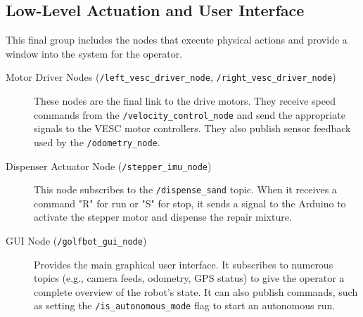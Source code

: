 \subsection{Low-Level Actuation and User Interface}
This final group includes the nodes that execute physical actions and provide a window into the system for the operator.
\begin{description}
    \item[Motor Driver Nodes (\texttt{/left\_vesc\_driver\_node}, \texttt{/right\_vesc\_driver\_node})] These nodes are the final link to the drive motors. They receive speed commands from the \texttt{/velocity\_control\_node} and send the appropriate signals to the VESC motor controllers. They also publish sensor feedback used by the \texttt{/odometry\_node}.
    \item[Dispenser Actuator Node (\texttt{/stepper\_imu\_node})] This node subscribes to the \texttt{/dispense\_sand} topic. When it receives a command "R" for run or "S" for stop, it sends a signal to the Arduino to activate the stepper motor and dispense the repair mixture.
    \item[GUI Node (\texttt{/golfbot\_gui\_node})] Provides the main graphical user interface. It subscribes to numerous topics (e.g., camera feeds, odometry, GPS status) to give the operator a complete overview of the robot's state. It can also publish commands, such as setting the \texttt{/is\_autonomous\_mode} flag to start an autonomous run.
\end{description}


